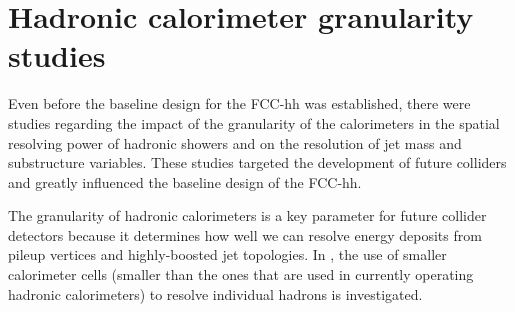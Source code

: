 \section{Hadronic calorimeter granularity studies}
\label{sec:gran}

Even before the baseline design for the FCC-hh was established, there were studies regarding the impact of the granularity of the calorimeters in the spatial resolving power of hadronic showers and on the resolution of jet mass and substructure variables. These studies targeted the development of future colliders and greatly influenced the baseline design of the FCC-hh.

The granularity of hadronic calorimeters is a key parameter for future collider detectors because it determines how well we can resolve energy deposits from pileup vertices and highly-boosted jet topologies. In \cite{FCC_HCALgran_doubleK}, the use of smaller calorimeter cells (smaller than the ones that are used in currently operating hadronic calorimeters) to resolve individual hadrons is investigated. 
